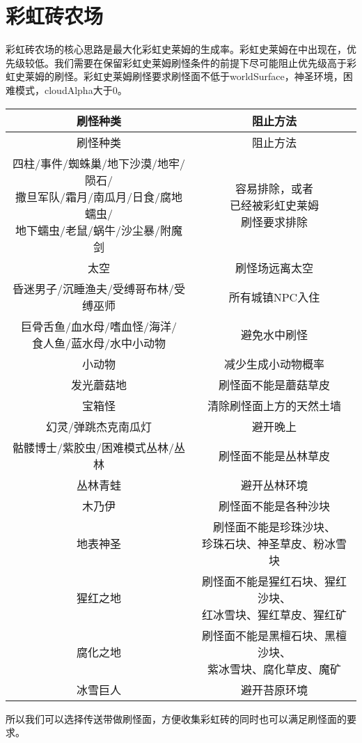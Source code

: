 \section{彩虹砖农场}
彩虹砖农场的核心思路是最大化彩虹史莱姆的生成率。彩虹史莱姆在中出现在，优先级较低。我们需要在保留彩虹史莱姆刷怪条件的前提下尽可能阻止优先级高于彩虹史莱姆的刷怪。彩虹史莱姆刷怪要求刷怪面不低于worldSurface，神圣环境，困难模式，cloudAlpha大于0。
\begin{longtable}{|c|c|}
\hline
刷怪种类&阻止方法\\\hline
\endfirsthead
\hline
刷怪种类&阻止方法\\\hline
\endhead
\hline
\endfoot
\makecell{四柱/事件/蜘蛛巢/地下沙漠/地牢/陨石/\\ 撒旦军队/霜月/南瓜月/日食/腐地蠕虫/\\ 地下蠕虫/老鼠/蜗牛/沙尘暴/附魔剑}&\makecell{容易排除，或者\\ 已经被彩虹史莱姆\\ 刷怪要求排除}\\\hline
太空&刷怪场远离太空\\\hline
昏迷男子/沉睡渔夫/受缚哥布林/受缚巫师&所有城镇NPC入住\\\hline
\makecell{巨骨舌鱼/血水母/嗜血怪/海洋/\\ 食人鱼/蓝水母/水中小动物}&避免水中刷怪\\\hline
小动物&减少生成小动物概率\\\hline
发光蘑菇地&刷怪面不能是蘑菇草皮\\\hline
宝箱怪&清除刷怪面上方的天然土墙\\\hline
幻灵/弹跳杰克南瓜灯&避开晚上\\\hline
骷髅博士/紫胶虫/困难模式丛林/丛林&刷怪面不能是丛林草皮\\\hline
丛林青蛙&避开丛林环境\\\hline
木乃伊&刷怪面不能是各种沙块\\\hline
地表神圣&\makecell{刷怪面不能是珍珠沙块、\\ 珍珠石块、神圣草皮、粉冰雪块}\\\hline
猩红之地&\makecell{刷怪面不能是猩红石块、猩红沙块、\\ 红冰雪块、猩红草皮、猩红矿}\\\hline
腐化之地&\makecell{刷怪面不能是黑檀石块、黑檀沙块、\\ 紫冰雪块、腐化草皮、魔矿}\\\hline
冰雪巨人&避开苔原环境
\end{longtable}
所以我们可以选择传送带做刷怪面，方便收集彩虹砖的同时也可以满足刷怪面的要求。


